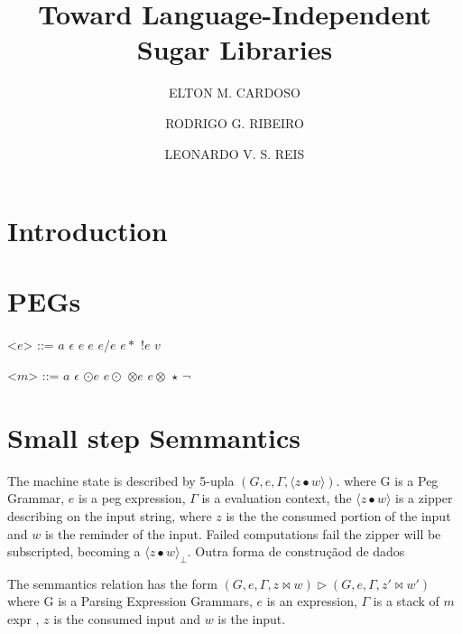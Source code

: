 \documentclass[manuscript, review, sigconf]{acmart}
\title{Toward Language-Independent Sugar Libraries}
\author{ELTON M. CARDOSO}
\affiliation{%
  \institution{Universidade Federal de Ouro Preto}
  \city{Ouro Preto}
  \state{Minas Gerais}
  \country{Brazil}
}
\author{RODRIGO G. RIBEIRO}
\affiliation{%
  \institution{Universidade Federal de Ouro Preto}
  \city{Ouro Preto}
  \state{Minas Gerais}
  \country{Brazil}
}
\author{LEONARDO V. S. REIS}
\affiliation{%
  \institution{Universidade Federal de Juiz de Fora}
  \city{Juiz de Fora}
  \state{Minas Gerais}
  \country{Brazil}
}
\begin{document}
\begin{abstract}

\end{abstract}


\maketitle
\renewcommand{\shortauthors}{CARDOSO et al.}

\section{Introduction} \label{sec:intro}


\section{PEGs} \label{sec:apeg}


\begin{grammar} 
 <$e$> ::= $a$
 \alt $\epsilon$
 \alt $e\;e$
 \alt $e / e$
 \alt $e*$
 \alt $!e$
 \alt $v$
\end{grammar}

\begin{grammar} 
 <$m$> ::= $a$
 \alt $\epsilon$
 \alt $\odot e$
 \alt $e \odot$
 \alt $\otimes e$
 \alt $e \otimes$
 \alt $\star$
 \alt $\neg$
\end{grammar}


\section{Small step Semmantics} \label{sec:sem}

The machine state is described by 5-upla $(G, e,\Gamma , \langle z\bullet w \rangle)$. where G is a Peg Grammar, $e$ is a peg expression, $\Gamma$ is a evaluation context, the  $\langle z\bullet w \rangle$ is a zipper describing on the input string, where
$z$ is the the consumed portion of the input and $w$ is the reminder of the input. Failed computations 
fail the zipper will be subscripted, becoming a $\langle z \bullet w \rangle_{\bot}$. 
 Outra forma de construçãod de dados 
 

The semmantics relation has the form $(G, e,\Gamma ,z\Join w) \rhd (G, e, \Gamma, z'\Join w')$
where G is a Parsing Expression Grammars, $e$ is an expression, $\Gamma$ is a stack of $m$ expr , $z$ is the consumed input and $w$ is the input.
\end{document}
